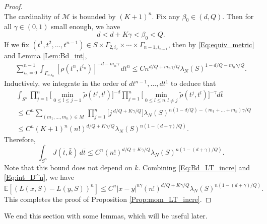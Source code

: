 \documentclass[11pt, reqno]{amsart}
\def\E{{\mathbb E}}
\numberwithin{equation}{section}
\begin{document}
\begin{proof}
\[\]
The cardinality of ${\mathcal M}$ is bounded by $(K+1)^n$.
Fix any $\beta_0 \in (d, Q)$. Then for all $\gamma \in (0, 1)$ small enough, we have
\[ d < d + K\gamma < \beta_0 < Q. \]
If we fix $(t^1, t^2, \dots, t^{n-1}) \in S \times \Gamma_{2, i_2} \times \cdots \times \Gamma_{n-1, i_{n-1}}$, 
then by \eqref{Eq:equiv_metric} and Lemma \ref{Lem:Bd_int},
\begin{align*}
\sum_{i_n=0}^{n-1}\int_{\Gamma_{n, i_n}} \left[\rho(t^n, t^{i_n})\right]^{-d-m_n\gamma} \, dt^n
\le C n^{d/Q+m_n\gamma/Q} \lambda_N(S)^{1-d/Q-m_n\gamma/Q}.
\end{align*}
Inductively, we integrate in the order of $dt^{n-1}, \dots, dt^1$ to deduce that
\begin{align*}
&\int_{S^n} \prod_{j=1}^n \Big[ \min_{0 \le l \le j-1} \tilde\rho(t^j, t^l)\Big]^{-d} \prod_{j=1}^n 
\Big[ \min_{0 \le l \le n, l \ne j} \tilde\rho(t^j, t^l)\Big]^{-\gamma}  d\bar{t}\\
&\le C^n \sum_{(m_1, \dots, m_n) \in M}\, \prod_{j=1}^n \Big[ j\,^{d/Q + K\gamma/Q} \Big] 
\lambda_N(S)^{n(1-d/Q) - (m_1+\dots+m_n)\gamma/Q}\\
& \le C^n (K+1)^n (n!)^{d/Q+K\gamma/Q} \lambda_N(S)^{n(1-(d+\gamma)/Q)}.
\end{align*}
Therefore, 
\begin{equation}\label{Eq:int_D^n}
\int_{S^n} J(\bar{t}, \bar{k}) \, d\bar{t} \le C^n (n!)^{d/Q+K\gamma/Q} \lambda_N(S)^{n(1-(d+\gamma)/Q)}.
\end{equation}
Note that this bound does not depend on $\bar{k}$.
Combining \eqref{Eq:Bd_LT_incre} and \eqref{Eq:int_D^n}, we have
\[ \E[(L(x, S) - L(y, S))^n] \le C^n |x-y|^{n\gamma} (n!)^{d/Q + K\gamma/Q} \lambda_N(S)^{n(1-(d+\gamma)/Q)}. \]
This completes the proof of Proposition \ref{Prop:mom_LT_incre}.
\end{proof}


We end this section with some lemmas, which will be useful later.
\end{document}
